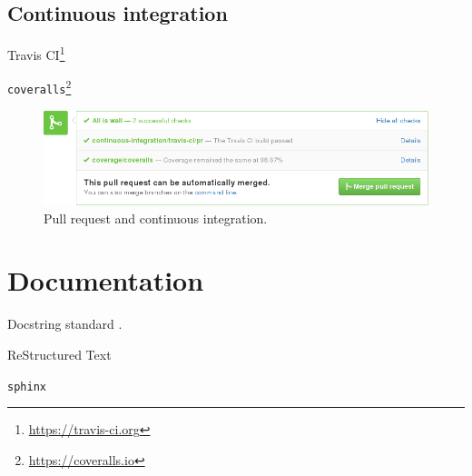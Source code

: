 \subsection{Continuous integration}

Travis CI\footnote{\url{https://travis-ci.org}}


\texttt{coveralls}\footnote{\url{https://coveralls.io}}

\begin{figure}
  \begin{centering}
    \includegraphics[width=5.5in]{fig/pull-request-ci.png}\par
  \end{centering}

  \caption{\label{fig:pull-request}Pull request and continuous integration.}
\end{figure}

\section{\label{sec:doc}Documentation}

Docstring standard \cite{SciPyProceedings_27}.

ReStructured Text

\texttt{sphinx}
